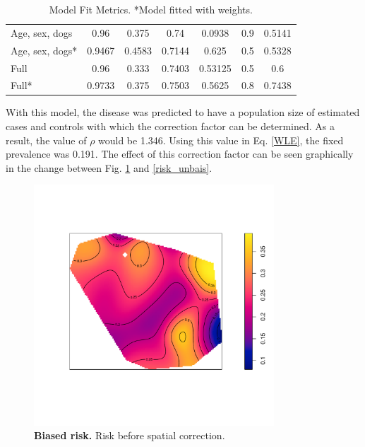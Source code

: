 \documentclass[10pt,letterpaper]{article}
\begin{document}
\begin{table}[]
\begin{tabular}{@{}lcccccc@{}}
		\multicolumn{1}{l|}{Age, sex, dogs}        & 0.96          & 0.375        & \multicolumn{1}{c|}{0.74}   & 0.0938        & 0.9          & 0.5141 \\
		\multicolumn{1}{l|}{Age, sex, dogs*}    & 0.9467        & 0.4583       & \multicolumn{1}{c|}{0.7144} & 0.625         & 0.5          & 0.5328 \\
		\multicolumn{1}{l|}{Full}        & 0.96          & 0.333        & \multicolumn{1}{c|}{0.7403} & 0.53125       & 0.5          & 0.6    \\
		\multicolumn{1}{l|}{Full*}    & 0.9733        & 0.375        & \multicolumn{1}{c|}{0.7503} & 0.5625        & 0.8          & 0.7438 \\ \bottomrule
	\end{tabular}
	\caption{Model Fit Metrics. *Model fitted with weights.}
\end{table}
With this model, the disease was predicted to have a population size of estimated cases and controls with which the correction factor can be determined. As a result, the value of $\rho$ would be 1.346. Using this value in Eq. \ref{WLE}, the fixed prevalence was 0.191. The effect of this correction factor can be seen graphically in the change between Fig. \ref{risk_bais} and \ref{risk_unbais}.
\begin{figure}[h]
\centering
\includegraphics[width=9cm]{images/risk_bais.pdf}
\caption{{\bf Biased risk.} Risk before spatial correction.}
\label{risk_bais}
\end{figure}
\end{document}
